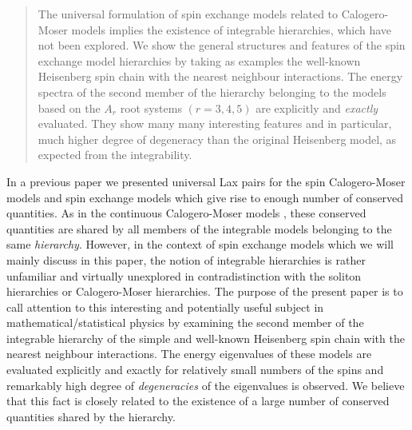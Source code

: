 \documentclass[a4paper,12pt]{article}
\begin{document}
\begin{abstract}
The universal formulation of  spin exchange models related to
Calogero-Moser
models implies the existence of integrable hierarchies, which
have not been explored. We show the general structures and features of the
spin exchange model hierarchies by taking as examples
the well-known Heisenberg
spin chain with the nearest neighbour interactions.
The energy spectra of the second
member  of the hierarchy belonging to the models based on the $A_r$ root
systems $(r=3,4,5)$ are  explicitly and {\em exactly\/} evaluated. They
show many many interesting features and in particular,
 much higher degree of degeneracy than the original Heisenberg  model,
 as expected from the integrability.
\end{abstract}
\bigskip
\bigskip
\bigskip



In a previous paper \cite{is1} we
 presented universal Lax pairs for the spin Calogero-Moser
 models \cite{suthsha2,fmp,HikWa} and spin exchange  models
\cite{halsha,ino1,simal,ino2} which give rise to enough
number of conserved quantities. As in the continuous Calogero-Moser models
\cite{Cal,Sut,CalMo}, these conserved quantities are shared by
all members of the
integrable models belonging to the same {\em hierarchy}.
However, in the context of
spin exchange models which we will mainly discuss in this paper, the notion
of
integrable hierarchies is rather unfamiliar and virtually unexplored in
contradistinction with the soliton hierarchies or Calogero-Moser
hierarchies.
The purpose of the present paper is to call attention to this interesting
and
potentially  useful subject in mathematical/statistical
physics by examining the
second member of the integrable hierarchy of the simple
and well-known Heisenberg
spin chain with the nearest neighbour interactions.
The energy eigenvalues of these models are evaluated explicitly and
exactly  for
relatively small  numbers of the spins and remarkably high degree of {\em
degeneracies} of the eigenvalues is observed. We believe that this fact
is  closely related to the existence of a large number of
conserved quantities shared
by the hierarchy.
\end{document}
